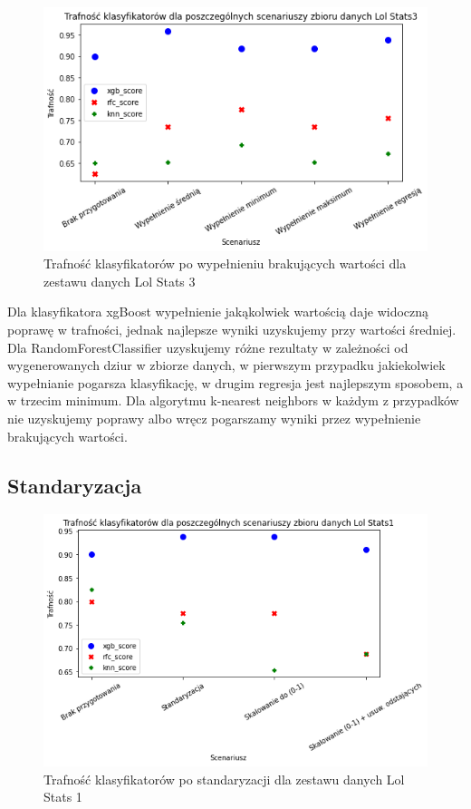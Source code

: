 \documentclass{book}
\begin{document}
\begin{figure}[H]
\centerline{\includegraphics[scale=0.5]{Lol_Stats_3_Wypełnienie_brakujących}}
\centering
\caption{Trafność klasyfikatorów po wypełnieniu brakujących wartości dla zestawu danych Lol Stats 3}
\end{figure}


Dla klasyfikatora xgBoost wypełnienie jakąkolwiek wartością daje widoczną poprawę w trafności, 
jednak najlepsze wyniki uzyskujemy przy wartości średniej. Dla RandomForestClassifier uzyskujemy 
różne rezultaty w zależności od wygenerowanych dziur w zbiorze danych, w pierwszym przypadku jakiekolwiek 
wypełnianie pogarsza klasyfikację, w drugim regresja jest najlepszym sposobem, a w trzecim minimum. 
Dla algorytmu k-nearest neighbors w każdym z przypadków nie uzyskujemy poprawy albo wręcz pogarszamy wyniki przez 
wypełnienie brakujących wartości.

\subsection{Standaryzacja}

\begin{figure}[H]
\centerline{\includegraphics[scale=0.5]{Lol_Stats_1_Standaryzacja}}
\centering
\caption{Trafność klasyfikatorów po standaryzacji dla zestawu danych Lol Stats 1}
\end{figure}
\end{document}
